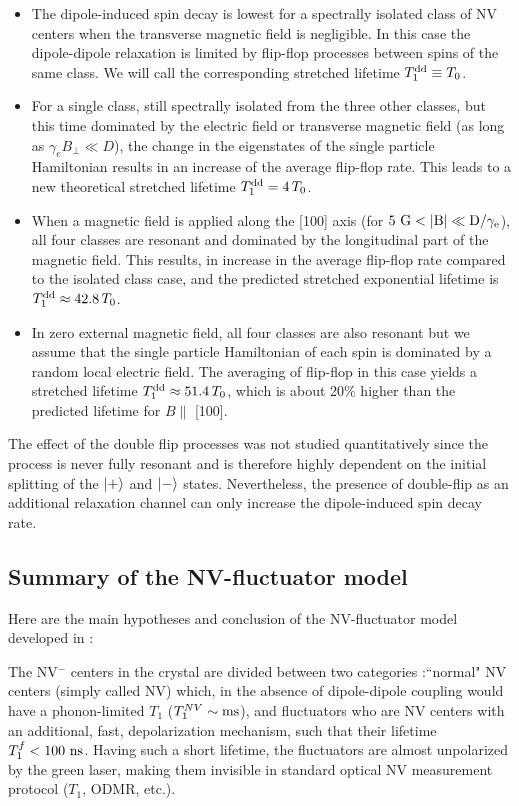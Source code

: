 \documentclass[preprintnumbers,amsmath,amssymb,onecolumn,12pt]{revtex4-2}\usepackage{graphicx}%
\begin{document}
\begin{itemize}
\item The dipole-induced spin decay is lowest for a spectrally isolated class of NV centers when the transverse magnetic field is negligible. In this case the dipole-dipole relaxation is limited by flip-flop processes between spins of the same class. We will call the corresponding stretched lifetime $T_1^{\rm dd}\equiv T_0$.
\item For a single class, still spectrally isolated   from the three other classes, but this time dominated by the electric field or transverse magnetic field (as long as $\gamma_e B_\perp \ll D$), the change in the eigenstates of the single particle Hamiltonian results in an increase of the average flip-flop rate. This leads to a new theoretical stretched lifetime $T_1^{\rm dd}= 4\, T_0$.
\item When a magnetic field is applied along the [100] axis (for $5\ \rm G < \abs{B} \ll D/\gamma_e$), all four classes are resonant and dominated by the longitudinal part of the magnetic field. This results, in increase in the average flip-flop rate compared to the isolated class case, and the predicted stretched exponential lifetime is $T_1^{\rm dd}\approx 42.8\, T_0$.
\item In zero external magnetic field, all four classes are also resonant but we assume that the single particle Hamiltonian of each spin is dominated by a random local electric field. The averaging of flip-flop in this case yields a stretched lifetime $T_1^{\rm dd}\approx 51.4\, T_0$, which is about 20\% higher than the predicted lifetime for $B \parallel$ [100].
\end{itemize}

The effect of the double flip processes was not studied quantitatively since the process is never fully resonant and is therefore highly dependent on the initial splitting of the $\ket{+}$ and $\ket{-} $ states. Nevertheless, the presence of double-flip as an additional relaxation channel can only increase the dipole-induced spin decay rate. 

\subsection{Summary of the NV-fluctuator model}
Here are the main hypotheses and conclusion of the NV-fluctuator model developed in \cite{choi_depolarization_2017} :

The NV$^-$ centers in the crystal are divided between two categories :``normal" NV centers (simply called NV) which, in the absence of dipole-dipole coupling would have a phonon-limited $T_1$ ($T_1^{NV}\sim \rm ms$), and fluctuators who are NV centers with an additional, fast, depolarization mechanism, such that their lifetime $T_1^f < 100\ \rm ns$. Having such a short lifetime, the fluctuators are almost unpolarized by the green laser, making them invisible in standard optical NV measurement protocol ($T_1$, ODMR, etc.). 
\end{document}
